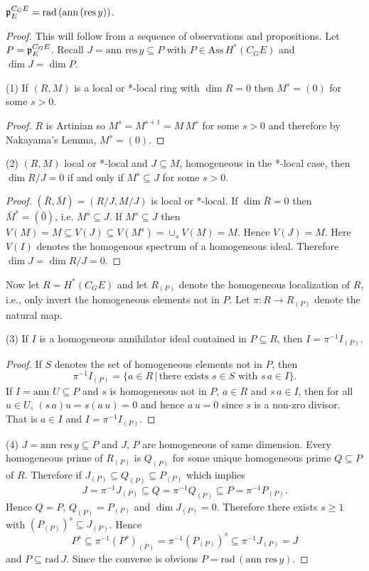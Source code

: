 \documentclass[10pt,a4paper]{amsart}
\newcommand\an{\text{ann}\,}
\newcommand\res{\text{res}}
\newcommand\sub{\subseteq}
\newcommand\vv{\,\vert\,}
\begin{document}
\begin{thm} $\frak p^{C_GE}_E=\text{rad}\,(\an(\res\,y))$. \end{thm}

\begin{proof} This will follow from a sequence of observations and propositions.  Let $P=\frak p^{C_GE}_E$.  Recall $J=\an\,\res\,y\sub P$ with $P\in \text{Ass}\,H^*(C_GE)$ and $\dim J=\dim P$.
\medskip
\par (1) If $(R,M)$ is a local or *-local ring with $\dim R=0$ then $M^s=(0)$ for some $s>0$.
\begin{proof} $R$ is Artinian so $M^s=M^{s+1}=M\, M^s$ for some $s>0$ and therefore by Nakayama's Lemma, $M^s=(0)$.\end{proof}

\par (2) $(R,M)$ local or *-local and $J\sub M$, homogeneous in the *-local case, then $\dim R/J=0$ if and only if $M^s\sub J$ for some $s>0$.
\begin{proof} $(\bar R,\bar M)=(R/J, M/J)$ is local or *-local.  If $\dim\bar R=0$ then $\bar M^s=(\bar 0)$, i.e. $M^s\sub J$.  If $M^s\sub J$ then $V(M)={M}\sub V(J)\sub V(M^s)=\cup_sV(M)={M}$.  Hence $V(J)={M}$. Here $V(I)$ denotes the homogenous spectrum of a homogeneous ideal. Therefore $\dim J=\dim R/J=0$. \end{proof}

Now let $R=H^*(C_GE)$ and let $R_{(P)}$ denote the homogeneous localization of $R$, i.e., only invert the homogeneous elements not in $P$.  Let $\pi:R\to R_{(P)}$ denote the natural map.

\par (3) If $I$ is a homogeneous annihilator ideal contained in $P\sub R$, then $I=\pi^{-1}I_{(P)}$.
\begin{proof} If $S$ denotes the set of homogeneous elements not in $P$, then  
$$ \pi^{-1}I_{(P)}=\{a\in R\vv \text{there exists } s\in S\text{ with }s\,a\in I \}.$$ If $I=\an\,U\sub P$ and $s$ is homogeneous not in $P$, $a\in R$ and $s\,a\in I$, then for all $u\in U$, $(s\,a)u=s(a\,u)=0$ and hence $a\,u=0$ since $s$ is a non-zro divisor. That is $a\in I$ and $I=\pi^{-1}I_{(P)}$. \end{proof}

\par (4) $J=\an\,\res\,y\sub P$ and $J$, $P$ are homogeneous of same dimension. Every homogeneous prime of $R_{(P)}$ is $Q_{(P)}$ for some unique homogeneous prime $Q\sub P$ of $R$.  Therefore if $J_{(P)}\sub Q_{(P)}\sub P_{(P)}$ which implies
$$ J=\pi^{-1}J_{(P)}\sub Q=\pi^{-1} Q_{(P)}\sub P=\pi^{-1} P_{(P)}.$$
Hence $Q=P$, $Q_{(P)}=P_{(P)}$ and $\dim J_{(P)}=0$.  Therefore there exists $s\geq 1$ with $(P_{(P)})^s\sub J_{(P)}$.
Hence $$ P^s\sub \pi^{-1}(P^s)_{(P)}= \pi^{-1}(P_{(P)})^s\sub \pi^{-1}J_{(P)}=J $$
and $P\sub\text{rad}\,J$. Since the converse is obvious $P=\text{rad}\,(\an\,\res\,y)$.
\end{proof}
\end{document}
